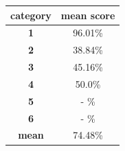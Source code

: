 \documentclass[c]{beamer}
\begin{document}
\begin{frame}
\begin{columns}
\begin{column}{0.5\textwidth}
\begin{overlayarea}{\linewidth}{2cm}
\begin{table}
\begin{center}
\begin{adjustbox}{max width=0.4\textwidth}
{\begin{tabular}{|c|c|}
      \hline
      \textbf{category} & \textbf{mean score}\\
      \hline
      \textbf{1} & 96.01\% \\
      \hline
      \textbf{2} & 38.84\% \\
      \hline
      \textbf{3} & 45.16\% \\
      \hline
      \textbf{4} & 50.0\% \\
      \hline
      \textbf{5} & - \% \\
      \hline
      \textbf{6} & - \% \\
      \hline
      \textbf{mean} & 74.48\% \\
      \hline
    \end{tabular}
    }
    \end{adjustbox}
    \end{center}
  \end{table}
  \end{overlayarea}
\end{column}
\end{columns}
\end{frame}


\end{document}
